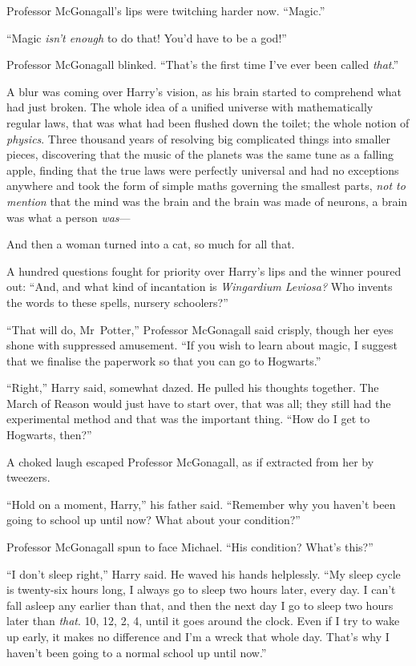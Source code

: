 Professor McGonagall’s lips were twitching harder now.
“Magic.”

“Magic \emph{isn’t enough} to do that!
You’d have to be a god!”

Professor McGonagall blinked.
“That’s the first time I’ve ever been called \emph{that}.”

A blur was coming over Harry’s vision, as his brain started to comprehend what had just broken.
The whole idea of a unified universe with mathematically regular laws, that was what had been flushed down the toilet; the whole notion of \emph{physics}.
Three thousand years of resolving big complicated things into smaller pieces, discovering that the music of the planets was the same tune as a falling apple, finding that the true laws were perfectly universal and had no exceptions anywhere and took the form of simple maths governing the smallest parts, \emph{not to mention} that the mind was the brain and the brain was made of neurons, a brain was what a person \emph{was}—

And then a woman turned into a cat, so much for all that.

A hundred questions fought for priority over Harry’s lips and the winner poured out: “And, and what kind of incantation is \emph{Wingardium Leviosa?} Who invents the words to these spells, nursery schoolers?”

“That will do, Mr~Potter,” Professor McGonagall said crisply, though her eyes shone with suppressed amusement.
“If you wish to learn about magic, I suggest that we finalise the paperwork so that you can go to Hogwarts.”

“Right,” Harry said, somewhat dazed.
He pulled his thoughts together.
The March of Reason would just have to start over, that was all; they still had the experimental method and that was the important thing.
“How do I get to Hogwarts, then?”

A choked laugh escaped Professor McGonagall, as if extracted from her by tweezers.

“Hold on a moment, Harry,” his father said.
“Remember why you haven’t been going to school up until now?
What about your condition?”

Professor McGonagall spun to face Michael.
“His condition?
What’s this?”

“I don’t sleep right,” Harry said.
He waved his hands helplessly.
“My sleep cycle is twenty-six hours long, I always go to sleep two hours later, every day.
I can’t fall asleep any earlier than that, and then the next day I go to sleep two hours later than \emph{that}.
10\pm, 12\am, 2\am, 4\am, until it goes around the clock.
Even if I try to wake up early, it makes no difference and I’m a wreck that whole day.
That’s why I haven’t been going to a normal school up until now.”

